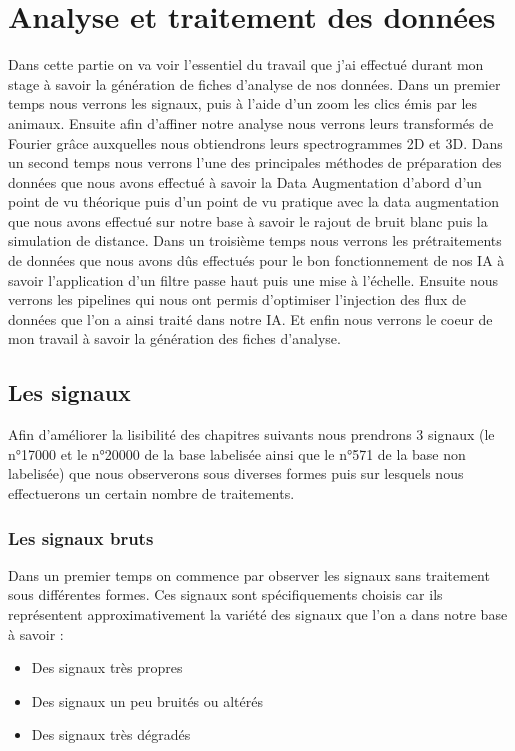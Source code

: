 
\hypertarget{Analyse-et-traitement-des-donnuxe9es}{%
\chapter{Analyse et traitement des données}\label{Analyse-et-traitement-des-donnuxe9es}}

Dans cette partie on va voir l'essentiel du travail que j'ai effectué durant mon stage à savoir la génération de fiches d'analyse de nos données. Dans un premier temps nous verrons les signaux, puis à l'aide d'un zoom les clics émis par les animaux. Ensuite afin d'affiner notre analyse nous verrons leurs transformés de Fourier grâce auxquelles nous obtiendrons leurs spectrogrammes 2D et 3D. Dans un second temps nous verrons l'une des principales méthodes de préparation des données que nous avons effectué à savoir la Data Augmentation d'abord d'un point de vu théorique puis d'un point de vu pratique avec la data augmentation que nous avons effectué sur notre base à savoir le rajout de bruit blanc puis la simulation de distance. Dans un troisième temps nous verrons les prétraitements de données que nous avons dûs effectués pour le bon fonctionnement de nos IA à savoir l'application d'un filtre passe haut puis une mise à l'échelle. Ensuite nous verrons les pipelines qui nous ont permis d'optimiser l'injection des flux de données que l'on a ainsi traité dans notre IA. Et enfin nous verrons le coeur de mon travail à savoir la génération des fiches d'analyse.

\hypertarget{Les-signaux}{%
\section{Les signaux}
\label{Les-signaux}}

Afin d'améliorer la lisibilité des chapitres suivants nous prendrons 3 signaux (le n°17000 et le n°20000 de la base labelisée ainsi que le n°571 de la base non labelisée) que nous observerons sous diverses formes puis sur lesquels nous effectuerons un certain nombre de traitements.

\hypertarget{Signaux-Bruts}{%
\subsection{Les signaux bruts}
\label{Signaux-Bruts}}

Dans un premier temps on commence par observer les signaux sans traitement sous différentes formes. Ces signaux sont spécifiquements choisis car ils représentent approximativement la variété des signaux que l'on a dans notre base à savoir :
\begin{itemize}
\item Des signaux très propres
\item Des signaux un peu bruités ou altérés
\item Des signaux très dégradés
\end{itemize}

